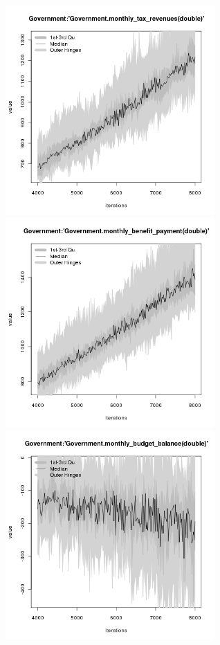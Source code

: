 \begin{figure}[H!]
\centering\leavevmode
\begin{minipage}{17cm}
\centering\leavevmode
\includegraphics[width=8cm]{./png/tax_0.05/Government-monthly_tax_revenues.png}
\includegraphics[width=8cm]{./png/tax_0.05/Government-monthly_benefit_payment.png}\\
\includegraphics[width=8cm]{./png/tax_0.05/Government-monthly_budget_balance.png}

\end{minipage}
\end{figure}
